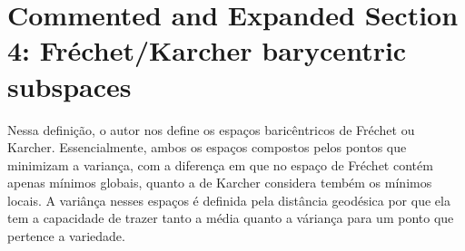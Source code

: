 \documentclass[a4paper,titlepage]{article}
\begin{document}
\section{Commented and Expanded Section 4: Fréchet/Karcher barycentric subspaces}
{
\vspace{1em}
\vspace{1em}
}
Nessa definição, o autor nos define os espaços baricêntricos de Fréchet ou Karcher. Essencialmente, ambos os espaços compostos pelos pontos que minimizam a variança, com a diferença em que no espaço de Fréchet contém apenas mínimos globais, quanto a de Karcher considera tembém os mínimos locais. A variânça nesses espaços é definida pela distância geodésica por que ela tem a capacidade de trazer tanto a média quanto a váriança para um ponto que pertence a variedade.
{
\vspace{1em}
\vspace{1em}
}
\end{document}
